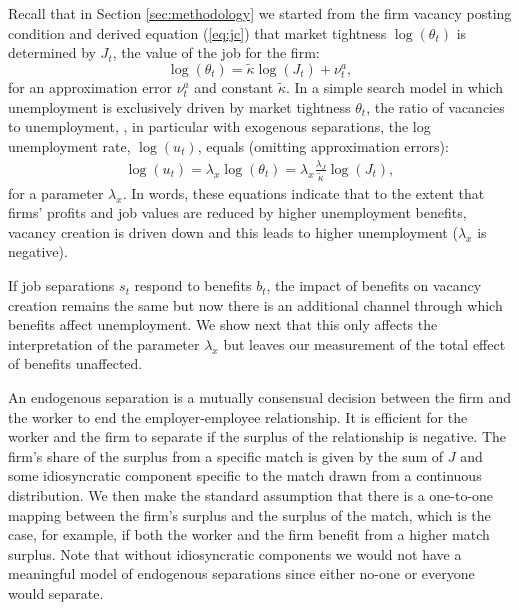 \documentclass[12pt]{article}
\newcommand{\1}{\mathbf{1}}
\newcommand{\beq}{\begin{eqnarray}}
\newcommand{\eeq}{\end{eqnarray}}
\begin{document}
\begin{appendix}
Recall that in Section \ref{sec:methodology} we started from the firm vacancy posting condition and derived equation (\ref{eq:jc}) that market tightness  
$\log(\theta_t)$ is determined by  $J_t$, the value of the job for the firm:
\begin{equation}
\log(\theta_t)=\tilde{\kappa} \log(J_t) + \nu^a_t,
\end{equation}
for an approximation error $\nu^a_t$ and constant $\tilde{\kappa}$.
In a simple search model in which unemployment is exclusively driven by market tightness $\theta_t$, the ratio of vacancies to unemployment, \citep{pissarides:00}, in particular with exogenous separations, the log unemployment rate, $\log(u_t)$, equals (omitting approximation errors):
\beq\label{eq:fec}
\log(u_t) =  \lambda_x \log(\theta_t) = \lambda_x \frac{\lambda_J}{\tilde{\kappa}} \log(J_t),
\eeq
for a parameter $\lambda_x$. In words, these equations indicate that to the extent that firms' profits and job values are reduced by higher unemployment benefits, vacancy creation is driven down and this leads to higher unemployment ($\lambda_x$ is negative).

If job separations $s_t$ respond to benefits $b_t$, the impact of benefits on vacancy creation remains the same but now there is an additional channel through which benefits affect unemployment. We show next that this only affects the interpretation of the parameter $\lambda_x$ but leaves our measurement of the total effect of benefits unaffected.

An endogenous separation is a mutually consensual decision between the firm and the worker to end the employer-employee relationship. It is efficient for the worker and the firm to separate if the surplus of the relationship is negative. 
The firm's share of the surplus from a specific match is given by the sum of $J$ and some idiosyncratic component specific to the match drawn from a continuous distribution.
We then make the standard assumption that there is a one-to-one mapping between the firm's surplus and the surplus of the match, which is the case, for example, if both the worker and the firm benefit from a higher match surplus.
Note that without idiosyncratic components we would not have a meaningful model of endogenous separations since either no-one or everyone would separate.




\end{appendix}
\end{document}
